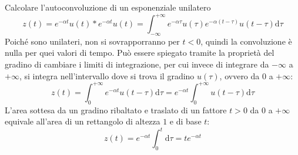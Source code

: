 \documentclass{article}
\newcommand{\df}{\mathrm{d}}
\begin{document}
\begin{center}
\end{center}

Calcolare l'autoconvoluzione di un esponenziale unilatero
\begin{equation*}
    z(t)=e^{-\alpha t}u(t)*e^{-\alpha t}u(t)=\displaystyle\int_{-\infty}^{+\infty}e^{-\alpha\tau}u(\tau)e^{-\alpha(t-\tau)}u(t-\tau)\df\tau
\end{equation*}
Poiché sono unilateri, non si sovrapporranno per $t<0$, quindi la convoluzione è nulla per quei valori di tempo. Può essere spiegato tramite la proprietà del gradino di 
cambiare i limiti di integrazione, per cui invece di integrare da $-\infty$ a $+\infty$, si integra nell'intervallo dove si trova il gradino $u(\tau)$, ovvero da $0$ a $+\infty$: 
\begin{equation*}
    z(t)=\displaystyle\int_0^{+\infty}e^{-\alpha t}u(t-\tau)\df\tau=e^{-\alpha t}\int_0^{+\infty}u(t-\tau)\df\tau
\end{equation*}
L'area sottesa da un gradino ribaltato e traslato di un fattore $t>0$ da $0$ a $+\infty$ equivale all'area di un rettangolo di altezza $1$ e di base $t$:
\begin{equation*}
    z(t)=e^{-\alpha t}\displaystyle\int_0^t\df\tau=te^{-\alpha t}
\end{equation*}
\end{document}
